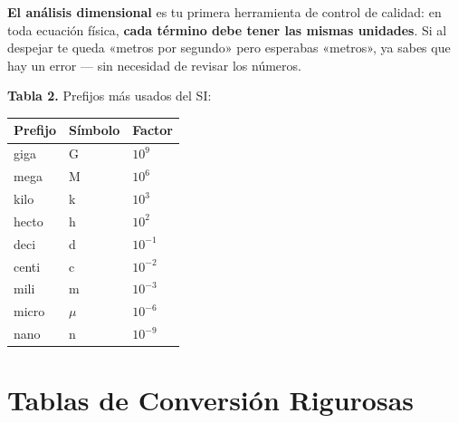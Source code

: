 \documentclass[12pt, letterpaper]{article}
\begin{document}
\noindent\textbf{El análisis dimensional} es tu primera herramienta de control de calidad: en toda ecuación física, \textbf{cada término debe tener las mismas unidades}. Si al despejar te queda «metros por segundo» pero esperabas «metros», ya sabes que hay un error — sin necesidad de revisar los números.

\newpage

\begin{cuadroteoria}
  \textbf{Tabla 2.} Prefijos más usados del SI:
  \begin{center}
    \begin{tabular}{lll}
      \toprule
      \textbf{Prefijo} & \textbf{Símbolo} & \textbf{Factor} \\
      \midrule
      giga   & G & $10^{9}$  \\
      mega   & M & $10^{6}$  \\
      kilo   & k & $10^{3}$  \\
      hecto  & h & $10^{2}$  \\
      deci   & d & $10^{-1}$ \\
      centi  & c & $10^{-2}$ \\
      mili   & m & $10^{-3}$ \\
      micro  & $\mu$ & $10^{-6}$ \\
      nano   & n & $10^{-9}$ \\
      \bottomrule
    \end{tabular}
  \end{center}
\end{cuadroteoria}

\section{Tablas de Conversión Rigurosas}
\end{document}
